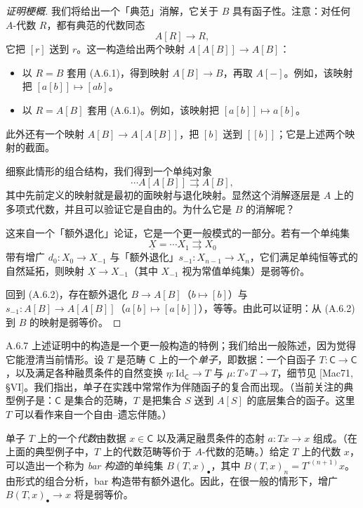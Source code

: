 \begin{proof}[证明梗概]
我们将给出一个「典范」消解，它关于 $B$ 具有函子性。注意：对任何 $A$-代数 $R$，都有典范的代数同态
\begin{equation}\tag{A.6.1}\label{eq:a6-07-2}
A[R]\to R,
\end{equation}
它把 $[r]$ 送到 $r$。这一构造给出两个映射 $A[A[B]]\to A[B]$：
\begin{itemize}
\item 以 $R=B$ 套用 (A.6.1)，得到映射 $A[B]\to B$，再取 $A[-]$。例如，该映射把 $[a[b]]\mapsto[ab]$。
\item 以 $R=A[B]$ 套用 (A.6.1)。例如，该映射把 $[a[b]]\mapsto a[b]$。
\end{itemize}
此外还有一个映射 $A[B]\to A[A[B]]$，把 $[b]$ 送到 $[[b]]$；它是上述两个映射的截面。

细察此情形的组合结构，我们得到一个单纯对象
\begin{equation}\tag{A.6.2}\label{eq:a6-07-3}
\cdots A[A[B]]\rightrightarrows A[B],
\end{equation}
其中先前定义的映射就是最初的面映射与退化映射。显然这个消解逐层是 $A$ 上的多项式代数，并且可以验证它是自由的。为什么它是 $B$ 的消解呢？

这来自一个「额外退化」论证，它是一个更一般模式的一部分。若有一个单纯集
\[
\underline X=\cdots X_1\rightrightarrows X_0
\]
带有增广 $d_0\colon X_0\to X_{-1}$ 与「额外退化」$s_{-1}\colon X_{n-1}\to X_n$，它们满足单纯恒等式的自然延拓，则映射 $\underline X\to X_{-1}$（其中 $X_{-1}$ 视为常值单纯集）是弱等价。

回到 (A.6.2)，存在额外退化 $B\to A[B]$（$b\mapsto[b]$）与 $s_{-1}\colon A[B]\to A[A[B]]$（$a[b]\mapsto[a[b]]$），等等。由此可以证明：从 (A.6.2) 到 $B$ 的映射是弱等价。
\end{proof}

\begin{rem}{A.6.7}\label{thm:a6-07-11}
上述证明中的构造是一个更一般构造的特例；我们给出一般陈述，因为觉得它能澄清当前情形。设 $T$ 是范畴 $\mathsf C$ 上的一个\emph{单子}，即数据：一个自函子 $T\colon\mathsf C\to\mathsf C$，以及满足各种融贯条件的自然变换 $\eta\colon\mathrm{Id}_{\mathsf C}\to T$ 与 $\mu\colon T\circ T\to T$，细节见 [Mac71, §VI]。我们指出，单子在实践中常常作为伴随函子的复合而出现。（当前关注的典型例子是：$\mathsf C$ 是集合的范畴，$T$ 是把集合 $S$ 送到 $A[S]$ 的底层集合的函子。这里 $T$ 可以看作来自一个自由–遗忘伴随。）

单子 $T$ 上的一个\emph{代数}由数据 $x\in\mathsf C$ 以及满足融贯条件的态射 $a\colon Tx\to x$ 组成。（在上面的典型例子中，$T$ 上的代数范畴等价于 $A$-代数的范畴。）给定 $T$ 上的代数 $x$，可以造出一个称为 \emph{bar 构造}的单纯集 $B(T,x)_\bullet$，其中 $B(T,x)_n=T^{\circ(n+1)}x$。由形式的组合分析，bar 构造带有额外退化。因此，在很一般的情形下，增广 $B(T,x)_\bullet\to x$ 将是弱等价。
\end{rem}

